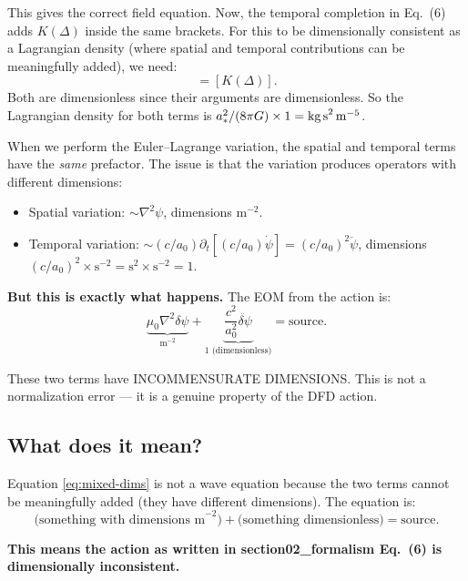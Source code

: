 \documentclass[11pt]{article}
\begin{document}
This gives the correct field equation. Now, the temporal completion in Eq.~(6) adds $K(\Delta)$ inside the same brackets. For this to be dimensionally consistent as a Lagrangian density (where spatial and temporal contributions can be meaningfully added), we need:
\begin{equation}
[W(y)] = [K(\Delta)].
\end{equation}
Both are dimensionless since their arguments are dimensionless. So the Lagrangian density for both terms is $a_*^2/(8\pi G) \times 1 = \text{kg\,s}^2\,\text{m}^{-5}$.

When we perform the Euler--Lagrange variation, the spatial and temporal terms have the \emph{same} prefactor. The issue is that the variation produces operators with different dimensions:

\begin{itemize}[nosep]
\item Spatial variation: $\sim \nabla^2\psi$, dimensions $\text{m}^{-2}$.
\item Temporal variation: $\sim (c/a_0)\partial_t[(c/a_0)\dot\psi] = (c/a_0)^2\ddot\psi$, dimensions $(c/a_0)^2 \times \text{s}^{-2} = \text{s}^2 \times \text{s}^{-2} = 1$.
\end{itemize}

\textbf{But this is exactly what happens.} The EOM from the action is:
\begin{equation}
\underbrace{\mu_0\nabla^2\delta\psi}_{\text{m}^{-2}}
+ \underbrace{\frac{c^2}{a_0^2}\ddot{\delta\psi}}_{1 \text{ (dimensionless)}} = \text{source}.
\label{eq:mixed-dims}
\end{equation}

These two terms have INCOMMENSURATE DIMENSIONS. This is not a normalization error --- it is a genuine property of the DFD action.

\subsection{What does it mean?}

Equation \eqref{eq:mixed-dims} is not a wave equation because the two terms cannot be meaningfully added (they have different dimensions). The equation is:
\begin{equation}
\text{(something with dimensions m}^{-2}\text{)} + \text{(something dimensionless)} = \text{source}.
\end{equation}

\textbf{This means the action as written in section02\_formalism Eq.~(6) is dimensionally inconsistent.}
\end{document}
